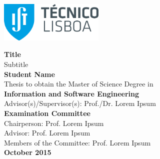 
\begin{titlepage}
\includegraphics[width=5cm]{images/ist_logo}~\\[2.0cm]
\begin{center}
{\LARGE \textbf{Title}}\\[1.0cm]
{\Large Subtitle}\\[1.0cm]
{\Large \textbf{Student Name}}\\[1.0cm]
{\large Thesis to obtain the Master of Science Degree in}\\[1.0cm]
{\LARGE \textbf{Information and Software Engineering}}\\[1.0cm]
{\large Advisor(s)/Supervisor(s): Prof./Dr. Lorem Ipsum}\\[1.0cm]
{\Large \textbf{Examination Committee}}\\
{\large Chairperson: Prof. Lorem Ipsum}\\
{\large Advisor: Prof. Lorem Ipsum}\\
{\large Members of the Committee: Prof. Lorem Ipsum}\\[1.0cm]
{\Large \textbf{October 2015}}\\
\end{center}
\end{titlepage}

